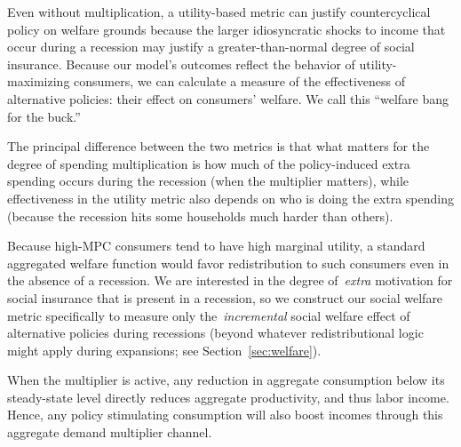 \documentclass[qe,draft]{econsocart}
\theoremstyle{plain}
\theoremstyle{definition}
\begin{document}
Even without multiplication, a utility-based metric can justify countercyclical policy on welfare grounds because the larger idiosyncratic shocks to income that occur during a recession may justify a greater-than-normal degree of social insurance.  Because our model's outcomes reflect the behavior of utility-maximizing consumers, we can calculate a measure of the effectiveness of alternative policies:  their effect on consumers' welfare.  We call this ``welfare bang for the buck.''

The principal difference between the two metrics is that what matters for the degree of spending multiplication is how much of the policy-induced extra spending occurs during the recession (when the multiplier matters), while effectiveness in the utility metric also depends on who is doing the extra spending (because the recession hits some households much harder than others).

Because high-MPC consumers tend to have high marginal utility, a standard aggregated welfare function would favor redistribution to such consumers even in the absence of a recession. We are interested in the degree of~\textit{extra} motivation for social insurance that is present in a recession, so we construct our social welfare metric specifically to measure only the~\textit{incremental} social welfare effect of alternative policies during recessions (beyond whatever redistributional logic might apply during expansions; see Section~\ref{sec:welfare}).


When the multiplier is active, any reduction in aggregate consumption below its steady-state level directly reduces aggregate productivity, and thus labor income. Hence, any policy stimulating consumption will also boost incomes through this aggregate demand multiplier channel.
\end{document}
